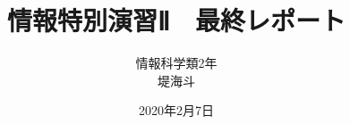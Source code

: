 \documentclass[a4j]{jsarticle}
\begin{document}
\begin{titlepage}
  \title{情報特別演習Ⅱ　最終レポート}
  \author{情報科学類2年\\堤海斗}
  \date{2020年2月7日}
  \maketitle
  \thispagestyle{empty}
  
\end{titlepage}

\begin{comment}
  ここに大まかな内容を書く
\end{comment}
\end{document}
